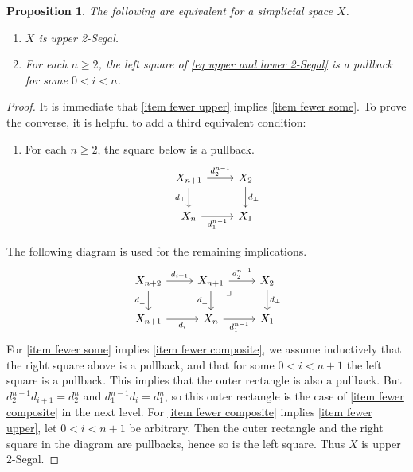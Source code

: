 \documentclass{amsart}
\newtheorem{proposition}[theorem]{Proposition}
\theoremstyle{definition}
\theoremstyle{remark}
\newcommand{\op}{\textup{op}}
\begin{document}
\begin{proposition}\label{prop fewer squares}
The following are equivalent for a simplicial space $X$.
\begin{enumerate}
\item $X$ is upper 2-Segal.\label{item fewer upper}
\item For each $n\geq 2$, the left square of \eqref{eq upper and lower 2-Segal} is a pullback for some $0 < i < n$.\label{item fewer some}
\end{enumerate}
\end{proposition}
\begin{proof}
It is immediate that \eqref{item fewer upper} implies \eqref{item fewer some}.
To prove the converse, it is helpful to add a third equivalent condition:
\begin{enumerate}[start=3]
\item For each $n\geq 2$, the square below is a pullback.\label{item fewer composite}
\[ \begin{tikzcd}
X_{n+1} \rar{d_2^{n-1}} \dar[swap]{d_\bot} & X_2 \dar{d_\bot} \\
X_n \rar[swap]{d_1^{n-1}} & X_1
\end{tikzcd} \]
\end{enumerate}
The following diagram is used for the remaining implications.
\[ \begin{tikzcd}
X_{n+2} \rar{d_{i+1}} \dar[swap]{d_\bot} &
X_{n+1} \rar{d_2^{n-1}} \dar[swap]{d_\bot} \ar[dr, phantom, "\lrcorner" very near start] & X_2 \dar{d_\bot}
\\
X_{n+1} \rar[swap]{d_i} & 
X_n \rar[swap]{d_1^{n-1}} & X_1
\end{tikzcd} \]
For \eqref{item fewer some} implies \eqref{item fewer composite}, we assume inductively that the right square above is a pullback, and that for some $0 < i < n+1$ the left square is a pullback. 
This implies that the outer rectangle is also a pullback.
But $d_2^{n-1}d_{i+1} = d_2^n$ and $d_1^{n-1}d_i = d_1^n$, so this outer rectangle is the case of \eqref{item fewer composite} in the next level.
For \eqref{item fewer composite} implies \eqref{item fewer upper}, let $0 < i < n+1$ be arbitrary. 
Then the outer rectangle and the right square in the diagram are pullbacks, hence so is the left square.
Thus $X$ is upper 2-Segal.
\end{proof}

\end{document}
